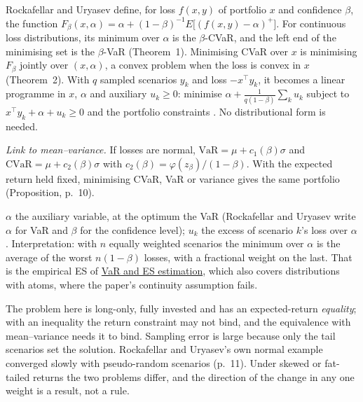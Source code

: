 \begin{qfmethod}\label{meth:mean-cvar-optimisation}
 Rockafellar and Uryasev define, for loss $f(x,y)$ of portfolio $x$ and confidence $\beta$, the function $F_\beta(x,\alpha)=\alpha+(1-\beta)^{-1}E\big[(f(x,y)-\alpha)^+\big]$. For continuous loss distributions, its minimum over $\alpha$ is the $\beta$-CVaR, and the left end of the minimising set is the $\beta$-VaR (Theorem~1). Minimising CVaR over $x$ is minimising $F_\beta$ jointly over $(x,\alpha)$, a convex problem when the loss is convex in $x$ (Theorem~2). With $q$ sampled scenarios $y_k$ and loss $-x^\top y_k$, it becomes a linear programme in $x$, $\alpha$ and auxiliary $u_k\ge0$: minimise $\alpha+\frac1{q(1-\beta)}\sum_ku_k$ subject to $x^\top y_k+\alpha+u_k\ge0$ and the portfolio constraints \citep[secs.~2--3, eqs.~(4)--(17), pp.~4--9]{s6-cvar}. No distributional form is needed.

\emph{Link to mean--variance.} If losses are normal, $\mathrm{VaR}=\mu+c_1(\beta)\sigma$ and $\mathrm{CVaR}=\mu+c_2(\beta)\sigma$ with $c_2(\beta)=\varphi(z_\beta)/(1-\beta)$. With the expected return held fixed, minimising CVaR, VaR or variance gives the same portfolio (Proposition, p.~10).

 $\alpha$ the auxiliary variable, at the optimum the VaR (Rockafellar and Uryasev write $\alpha$ for VaR and $\beta$ for the confidence level); $u_k$ the excess of scenario $k$'s loss over $\alpha$. Interpretation: with $n$ equally weighted scenarios the minimum over $\alpha$ is the average of the worst $n(1-\beta)$ losses, with a fractional weight on the last. That is the empirical ES of \hyperref[meth:var-es-estimation-methods]{VaR and ES estimation}, which also covers distributions with atoms, where the paper's continuity assumption fails.

 The problem here is long-only, fully invested and has an expected-return \emph{equality}; with an inequality the return constraint may not bind, and the equivalence with mean--variance needs it to bind. Sampling error is large because only the tail scenarios set the solution. Rockafellar and Uryasev's own normal example converged slowly with pseudo-random scenarios (p.~11). Under skewed or fat-tailed returns the two problems differ, and the direction of the change in any one weight is a result, not a rule.


\end{qfmethod}
